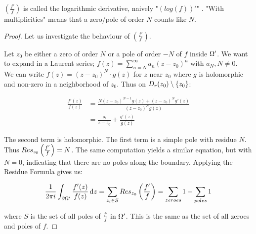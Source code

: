 \begin{note}
$\left( \frac{f'}{f} \right)$ is called the logarithmic derivative, naively "$(log(f))'$" . "With multiplicities" means that a zero/pole of order $N$ counts like $N$.
\end{note}

\begin{center}
\end{center}



\begin{proof} Let us investigate the behaviour of $\left( \frac{f'}{f} \right)$.

Let $z_0$ be either a zero of order $N$ or a pole of order $-N$ of $f$ inside $\Omega '$. We want to expand in a Laurent series; $f(z) = \sum_{n=N}^\infty a_n (z-z_0)^n$ with $a_N,N \neq 0$.\\

We can write $f(z)  = (z-z_0)^N \cdot g(z)$ for $z$ near $z_0$ where $g$ is holomorphic and non-zero in a neighborhood of $z_0$. Thus on $D_r (z_0) \setminus \{ z_0 \}$:

\begin{align*}
\frac{f'(z)}{f(z)} &= \frac{N(z-z_0)^{N-1} g(z) + (z-z_0)^N g'(z)}{(z-z_0)^N g(z)}\\
&= \frac{N}{z-z_0}+ \frac{g'(z)}{g(z)}
\end{align*}

The second term is holomorphic. The first term is a simple pole with residue $N$. Thus $Res_{z_0} \left( \frac{f'}{f} \right) = N$. The same computation yields a similar equation, but with $N=0$, indicating that there are no poles along the boundary. Applying the Residue Formula gives us:

\begin{align*}
    \frac{1}{2 \pi i} \int_{\partial \om '} \frac{f'(z)}{f(z)} \dif z = \sum_{z_i \in S} \res{z_0}{\frac{f'}{f}} = \sum_{zeroes} 1 - \sum_{poles} 1
\end{align*}

where $S$ is the set of all poles of $\frac{f'}{f}$ in $\Omega '$. This is the same as the set of all zeroes and poles of $f$.

\end{proof}


